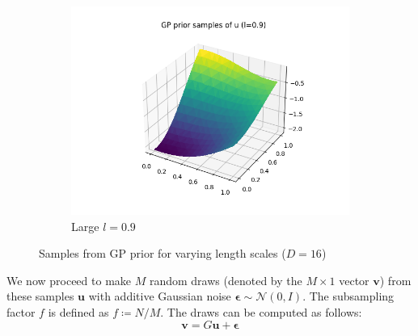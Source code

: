 \documentclass[]{article}
\newcommand{\Ncal}{\mathcal{N}}
\newcommand{\ubold}{\boldsymbol{u}}
\newcommand{\vbold}{\boldsymbol{v}}
\newcommand{\epsbold}{\boldsymbol{\epsilon}}
\begin{document}
\begin{figure}[!h]
\begin{subfigure}{0.32\linewidth}
		\includegraphics[width=\linewidth]{u-big.png}
		\caption{Large $l=0.9$}
	\end{subfigure}
	\caption{Samples from GP prior for varying length scales ($D=16$)}
	\label{fig:l-effect}
\end{figure}

We now proceed to make $M$ random draws (denoted by the $M \times 1$ vector $\vbold$) from these samples $\ubold$ with additive Gaussian noise $\epsbold \sim \Ncal(0, I)$. The subsampling factor $f$ is defined as $f \coloneqq N / M$. The draws can be computed as follows:
%
\begin{equation}
	\vbold = G \ubold + \epsbold
	\label{eqn:v-defn}
\end{equation}
\end{document}
